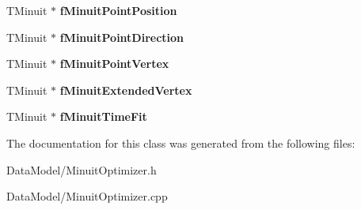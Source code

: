 \begin{DoxyCompactItemize}
\item 
\hypertarget{classMinuitOptimizer_ae9c9ea28e6e734256038f638a316dce2}{T\-Minuit $\ast$ {\bfseries f\-Minuit\-Point\-Position}}\label{classMinuitOptimizer_ae9c9ea28e6e734256038f638a316dce2}

\item 
\hypertarget{classMinuitOptimizer_aaef0452e7c4311746d61a9576cdc8150}{T\-Minuit $\ast$ {\bfseries f\-Minuit\-Point\-Direction}}\label{classMinuitOptimizer_aaef0452e7c4311746d61a9576cdc8150}

\item 
\hypertarget{classMinuitOptimizer_a0b125bfd1ad8d29f7d54f5e2e260ed07}{T\-Minuit $\ast$ {\bfseries f\-Minuit\-Point\-Vertex}}\label{classMinuitOptimizer_a0b125bfd1ad8d29f7d54f5e2e260ed07}

\item 
\hypertarget{classMinuitOptimizer_a89ca28d4d41d55eeeb71f3f34409d1aa}{T\-Minuit $\ast$ {\bfseries f\-Minuit\-Extended\-Vertex}}\label{classMinuitOptimizer_a89ca28d4d41d55eeeb71f3f34409d1aa}

\item 
\hypertarget{classMinuitOptimizer_a3c66ea05f5c285f977cefa51d872b2b8}{T\-Minuit $\ast$ {\bfseries f\-Minuit\-Time\-Fit}}\label{classMinuitOptimizer_a3c66ea05f5c285f977cefa51d872b2b8}

\end{DoxyCompactItemize}


The documentation for this class was generated from the following files\-:\begin{DoxyCompactItemize}
\item 
Data\-Model/Minuit\-Optimizer.\-h\item 
Data\-Model/Minuit\-Optimizer.\-cpp\end{DoxyCompactItemize}
